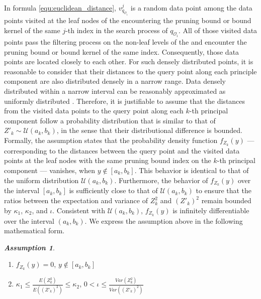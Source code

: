 In formula \ref{equ:euclidean_distance}, $v^{j}_{q_{\mathcal{O}_i}}$ is a random data point among the data points visited at the leaf nodes of the \dualtree encountering the pruning bound or bound kernel of the same $j$-th index in the search process of $q_{\mathcal{O}_i}$. All of those visited data points pass the filtering process on the non-leaf levels of the \dualtree and encounter the pruning bound or bound kernel of the same index. Consequently, those data points are located closely to each other. For such densely distributed points, it is reasonable to consider that their distances to the query point along each principle component are also distributed densely in a narrow range. Data densely distributed within a narrow interval can be reasonably approximated as uniformly distributed \cite{gning2010mixture, reiss1981uniform, chasani2022uu}. Therefore, it is justifiable to assume that the distances from the visited data points to the query point along each $k$-th principal component follow a probability distribution that is similar to that of $Z'_k \sim \mathcal{U}(a_k, b_k)$, in the sense that their distributional difference is bounded. Formally, the assumption states that the probability density function $f_{Z_k}(y)$ — corresponding to the distances between the query point and the visited data points at the leaf nodes with the same pruning bound index on the \(k\)-th principal component — vanishes, when $y\notin [a_k, b_k]$. This behavior is identical to that of the uniform distribution $\mathcal{U}(a_k, b_k)$. Furthermore, the behavior of $f_{Z_k}(y)$ over the interval $[a_k, b_k]$ is sufficiently close to that of $\mathcal{U}(a_k, b_k)$ to ensure that the ratios between the expectation and variance of $Z_k^2$ and $(Z'_k)^2$ remain bounded by $\kappa_1$, $\kappa_2$, and $\iota$. Consistent with $\mathcal{U}(a_k,b_k)$, $f_{Z_k}(y)$ is infinitely differentiable over the interval $(a_k,b_k)$. We express the assumption above in the following mathematical form.

\noindent \textbf{\textit{Assumption 1}}.
\begin{enumerate}
    \item
$f_{Z_k}(y)=0$, $y\notin[a_k,b_k]$  
    \item 
$\kappa_1 \leq \frac{E(Z^2_k)}{E((Z'_k)^2)}\leq \kappa_2$,  $0<\iota\leq \frac{Var(Z^2_k)}{Var((Z'_k)^2)}$ 
\end{enumerate}

